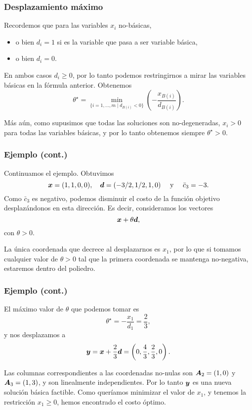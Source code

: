 \documentclass[aspectratio=169,12pt,spanish]{beamer}
\begin{document}

\begin{frame}
\frametitle{Desplazamiento máximo}


Recordemos que para las variables $x_i$ no-básicas, 
\begin{itemize}
\item o bien $d_i = 1$ si es la variable que pasa a ser variable básica, 
\item o bien $d_i = 0$.
\end{itemize}

En ambos casos $d_i \ge 0$, por lo tanto podemos restringirnos a mirar las variables básicas en la fórmula anterior. Obtenemos
\begin{equation}
\label{eq:thetastar}
\theta^\star = \min_{\{i = 1, \dots, m \mid d_{B(i)} < 0 \}}\left(-\frac{x_{B(i)}}{d_{B(i)}}\right).
\end{equation}

Más aún, como supusimos que todas las soluciones son no-degeneradas, $x_i > 0$ para todas las variables básicas, y por lo tanto obtenemos siempre $\theta^\star > 0$.

\end{frame}


\begin{frame}
\frametitle{Ejemplo (cont.)}

Continuamos el ejemplo. Obtuvimos 
$$\bm{x} = (1, 1, 0, 0), \quad \bm{d} = (-3/2, 1/2, 1, 0)\quad \text{ y } \quad \bar c_3 = -3.$$ 
Como $\bar c_3$ es negativo, podemos disminuir el costo de la función objetivo desplazándonos en esta dirección. Es decir, consideramos los vectores
$$
\bm{x} + \theta \bm{d},
$$
con $\theta > 0$. 

La única coordenada que decrece al desplazarnos es $x_1$, por lo que si tomamos cualquier valor de $\theta > 0$ tal que la primera coordenada se mantenga no-negativa, estaremos dentro del poliedro. 

\end{frame}


\begin{frame}
\frametitle{Ejemplo (cont.)}

El máximo valor de $\theta$ que podemos tomar es
$$
\theta^\star = -\frac{x_1}{d_1} = \frac{2}{3},
$$
y nos desplazamos a
$$
\bm{y} = \bm{x} + \frac{2}{3} \bm{d} = \left(0, \frac{4}{3}, \frac{2}{3}, 0\right).
$$

Las columnas correspondientes a las coordenadas no-nulas son $\bm{A}_2 = (1, 0)$ y $\bm{A}_3 = (1,3)$, y son linealmente independientes. Por lo tanto $\bm{y}$ es una nueva solución básica factible. Como queríamos minimizar el valor de $x_1$, y tenemos la restricción $x_1 \ge 0$, hemos encontrado el costo óptimo.

\end{frame}
\end{document}
